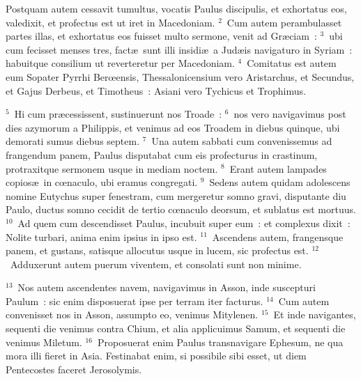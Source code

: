 \lettrine[lines=3,image=true,loversize=0.05,lraise=-0.03]{P}{}ostquam autem cessavit tumultus, vocatis Paulus discipulis, et exhortatus eos, valedixit, et profectus est ut iret in Macedoniam.
${}^{2}$~Cum autem perambulasset partes illas, et exhortatus eos fuisset multo sermone, venit ad Gr\ae ciam~:
${}^{3}$~ubi cum fecisset menses tres, fact\ae\ sunt illi insidi\ae\ a Jud\ae is navigaturo in Syriam~: habuitque consilium ut reverteretur per Macedoniam.
${}^{4}$~Comitatus est autem eum Sopater Pyrrhi Berœensis, Thessalonicensium vero Aristarchus, et Secundus, et Gajus Derbeus, et Timotheus~: Asiani vero Tychicus et Trophimus.


${}^{5}$~Hi cum pr\ae cessissent, sustinuerunt nos Troade~:
${}^{6}$~nos vero navigavimus post dies azymorum a Philippis, et venimus ad eos Troadem in diebus quinque, ubi demorati sumus diebus septem.
${}^{7}$~Una autem sabbati cum convenissemus ad frangendum panem, Paulus disputabat cum eis profecturus in crastinum, protraxitque sermonem usque in mediam noctem.
${}^{8}$~Erant autem lampades copios\ae\ in cœnaculo, ubi eramus congregati.
${}^{9}$~Sedens autem quidam adolescens nomine Eutychus super fenestram, cum mergeretur somno gravi, disputante diu Paulo, ductus somno cecidit de tertio cœnaculo deorsum, et sublatus est mortuus.
${}^{10}$~Ad quem cum descendisset Paulus, incubuit super eum~: et complexus dixit~: Nolite turbari, anima enim ipsius in ipso est.
${}^{11}$~Ascendens autem, frangensque panem, et gustans, satisque allocutus usque in lucem, sic profectus est.
${}^{12}$~Adduxerunt autem puerum viventem, et consolati sunt non minime.


${}^{13}$~Nos autem ascendentes navem, navigavimus in Asson, inde suscepturi Paulum~: sic enim disposuerat ipse per terram iter facturus.
${}^{14}$~Cum autem convenisset nos in Asson, assumpto eo, venimus Mitylenen.
${}^{15}$~Et inde navigantes, sequenti die venimus contra Chium, et alia applicuimus Samum, et sequenti die venimus Miletum.
${}^{16}$~Proposuerat enim Paulus transnavigare Ephesum, ne qua mora illi fieret in Asia. Festinabat enim, si possibile sibi esset, ut diem Pentecostes faceret Jerosolymis.


